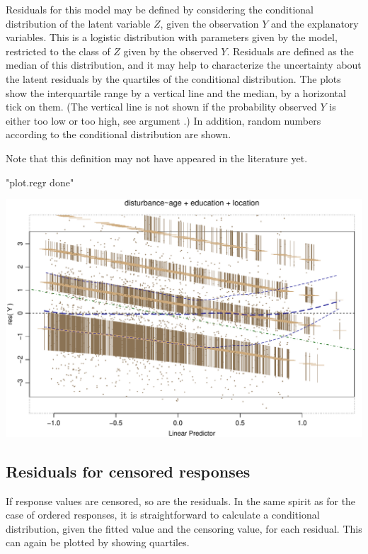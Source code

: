 \documentclass[11pt]{article}
\begin{document}
Residuals for this model may be defined by considering the conditional
distribution of the latent variable $Z$, given the observation $Y$ and the
explanatory variables. This is a logistic distribution with parameters
given by the model, restricted to the class of $Z$ given by the observed
$Y$. Residuals are defined as the median of this distribution, and 
it may help to characterize the uncertainty about the latent residuals by 
the quartiles of the conditional distribution.
The plots show the interquartile range by a vertical line and the median,
by a horizontal tick on them. (The vertical line is not shown if the 
probability observed $Y$ is either too low or too high, see argument
.)
In addition, random numbers according to the conditional distribution are
shown. 

Note that this definition may not have appeared in the literature yet.

\Bfig
\begin{Schunk}
\begin{Soutput}
[1] "plot.regr done"
\end{Soutput}
\end{Schunk}
\includegraphics{regr-description-taordered}
  
  
\subsection{Residuals for censored responses}
If response values are censored, so are the residuals. In the same spirit
as for the case of ordered responses, it is straightforward to calculate 
a conditional distribution, given the fitted value and the censoring value,
for each residual. This can again be plotted by showing quartiles.
\end{document}
